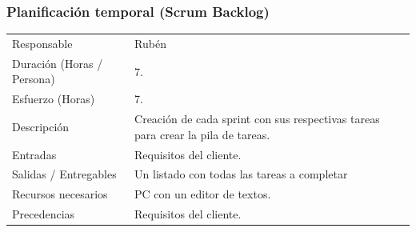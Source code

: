 \subsubsection{Planificaci\'{o}n temporal (Scrum Backlog)}
\begin{table}[H]
    \begin{center}
        \begin{tabular}{l p{8cm}}
            Responsable                           & Rub\'{e}n \\
            Duraci\'{o}n (Horas / Persona)        & 7. \\ 
            Esfuerzo (Horas)                      & 7. \\
            Descripci\'{o}n                       & Creaci\'on de cada sprint con sus respectivas tareas para crear la pila de tareas. \\
            Entradas                              & Requisitos del cliente.\\
            Salidas / Entregables                 & Un listado con todas las tareas a completar \\
            Recursos necesarios                   & PC con un editor de textos.\\
            Precedencias                          & Requisitos del cliente. \\
        \end{tabular}
    \end{center}
    
\end{table}

